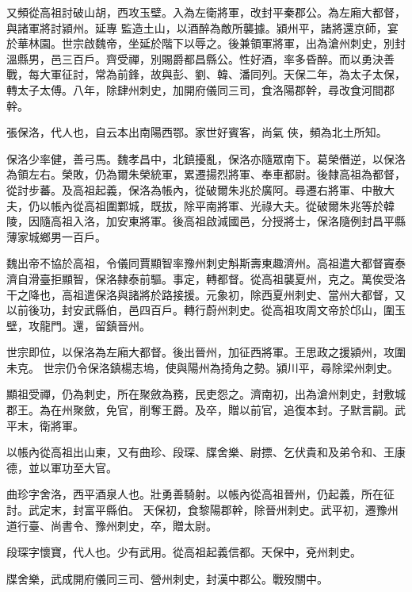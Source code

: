 \begin{pinyinscope}
 又頻從高祖討破山胡，西攻玉壁。入為左衛將軍，改封平秦郡公。為左廂大都督，與諸軍將討潁州。延專
 監造土山，以酒醉為敵所襲據。潁州平，諸將還京師，宴於華林園。世宗啟魏帝，坐延於階下以辱之。後兼領軍將軍，出為滄州刺史，別封溫縣男，邑三百戶。齊受禪，別賜爵都昌縣公。性好酒，率多昏醉。而以勇決善戰，每大軍征討，常為前鋒，故與彭、劉、韓、潘同列。天保二年，為太子太保，轉太子太傅。八年，除肆州刺史，加開府儀同三司，食洛陽郡幹，尋改食河間郡幹。



 張保洛，代人也，自云本出南陽西鄂。家世好賓客，尚氣
 俠，頻為北土所知。



 保洛少率健，善弓馬。魏孝昌中，北鎮擾亂，保洛亦隨眾南下。葛榮僭逆，以保洛為領左右。榮敗，仍為爾朱榮統軍，累遷揚烈將軍、奉車都尉。後隸高祖為都督，從討步蕃。及高祖起義，保洛為帳內，從破爾朱兆於廣阿。尋遷右將軍、中散大夫，仍以帳內從高祖圍鄴城，既拔，除平南將軍、光祿大夫。從破爾朱兆等於韓陵，因隨高祖入洛，加安東將軍。後高祖啟減國邑，分授將士，保洛隨例封昌平縣薄家城鄉男一百戶。



 魏出帝不協於高祖，令儀同賈顯智率豫州刺史斛斯壽東趣濟州。高祖遣大都督竇泰濟自滑臺拒顯智，保洛隸泰前驅。事定，轉都督。從高祖襲夏州，克之。萬俟受洛干之降也，高祖遣保洛與諸將於路接援。元象初，除西夏州刺史、當州大都督，又以前後功，封安武縣伯，邑四百戶。轉行蔚州刺史。從高祖攻周文帝於邙山，圍玉壁，攻龍門。還，留鎮晉州。



 世宗即位，以保洛為左廂大都督。後出晉州，加征西將軍。王思政之援潁州，攻圍未克。
 世宗仍令保洛鎮楊志塢，使與陽州為掎角之勢。潁川平，尋除梁州刺史。



 顯祖受禪，仍為刺史，所在聚斂為務，民吏怨之。濟南初，出為滄州刺史，封敷城郡王。為在州聚斂，免官，削奪王爵。及卒，贈以前官，追復本封。子默言嗣。武平末，衛將軍。



 以帳內從高祖出山東，又有曲珍、段琛、牒舍樂、尉摽、乞伏貴和及弟令和、王康德，並以軍功至大官。



 曲珍字舍洛，西平酒泉人也。壯勇善騎射。以帳內從高祖晉州，仍起義，所在征討。武定末，封富平縣伯。
 天保初，食黎陽郡幹，除晉州刺史。武平初，遷豫州道行臺、尚書令、豫州刺史，卒，贈太尉。



 段琛字懷寶，代人也。少有武用。從高祖起義信都。天保中，兗州刺史。



 牒舍樂，武成開府儀同三司、營州刺史，封漢中郡公。戰歿關中。




\end{pinyinscope}
